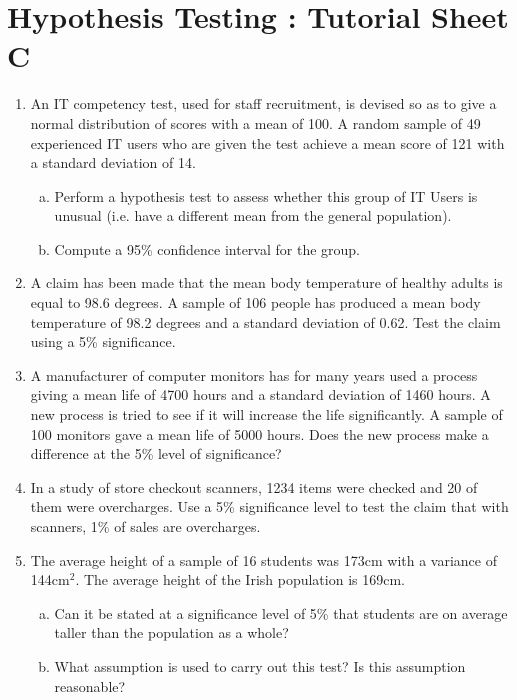 \documentclass[a4paper,12pt]{article}
\begin{document}
\section*{Hypothesis Testing : Tutorial Sheet C}
\begin{enumerate}

\item 
An IT competency test, used for staff recruitment, is devised so as to give a normal distribution of scores with a mean of 100. A random sample of 49 experienced IT users  who are given the test achieve a mean score of 121 with a standard deviation of 14. 

\begin{enumerate}[(a)]
\item	Perform a hypothesis test to assess whether this group of IT Users is unusual (i.e. have a different mean from the general population).
\item	Compute a 95\% confidence interval for the group.
\end{enumerate}
\item  
A claim has been made that the mean body temperature of healthy adults is equal to 98.6 degrees. 
A sample of 106 people has produced a mean body temperature of 98.2 degrees and a standard deviation of 0.62. Test the claim using a 5\% significance.

\item 
A manufacturer of computer monitors  has for many years used a process giving a mean life of 4700 hours and a standard deviation of 1460 hours. 
A new process is tried to see if it will increase the life significantly. A sample of 100 monitors gave a mean life of 5000 hours.  
Does the new process make a difference at the 5\% level of significance?

\item In a study of store checkout scanners, 1234 items were checked and 20 of them were overcharges.
Use a 5\% significance level to test the claim that with scanners, 1\% of sales are overcharges.




\item The average height of a sample of 16 students was 173cm with a variance of 144cm$^2$. The average height of the Irish population is 169cm. 
\begin{enumerate}[(a)]
\item Can it be stated at a significance level of 5\% that students are on average taller than the population as a whole? 
\item What assumption is used to carry out this test? Is this assumption reasonable?
\end{enumerate}



\end{enumerate}
\end{document}
